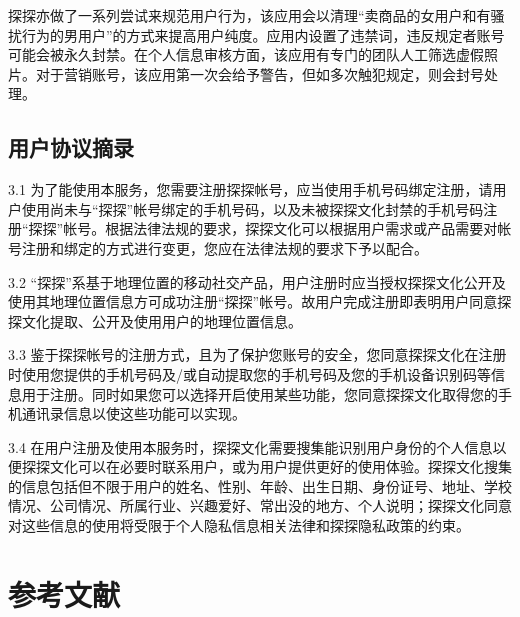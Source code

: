 \documentclass[UTF8]{ctexart}
\begin{document}
探探亦做了一系列尝试来规范用户行为，该应用会以清理“卖商品的女用户和有骚扰行为的男用户”的方式来提高用户纯度。应用内设置了违禁词，违反规定者账号可能会被永久封禁。在个人信息审核方面，该应用有专门的团队人工筛选虚假照片。对于营销账号，该应用第一次会给予警告，但如多次触犯规定，则会封号处理。

\subsection{}

\subsection{用户协议摘录}
\begin{tcolorbox}
    3.1 为了能使用本服务，您需要注册探探帐号，应当使用手机号码绑定注册，请用户使用尚未与“探探”帐号绑定的手机号码，以及未被探探文化封禁的手机号码注册“探探”帐号。根据法律法规的要求，探探文化可以根据用户需求或产品需要对帐号注册和绑定的方式进行变更，您应在法律法规的要求下予以配合。

    3.2 “探探”系基于地理位置的移动社交产品，用户注册时应当授权探探文化公开及使用其地理位置信息方可成功注册“探探”帐号。故用户完成注册即表明用户同意探探文化提取、公开及使用用户的地理位置信息。

    3.3 鉴于探探帐号的注册方式，且为了保护您账号的安全，您同意探探文化在注册时使用您提供的手机号码及/或自动提取您的手机号码及您的手机设备识别码等信息用于注册。同时如果您可以选择开启使用某些功能，您同意探探文化取得您的手机通讯录信息以使这些功能可以实现。

    3.4 在用户注册及使用本服务时，探探文化需要搜集能识别用户身份的个人信息以便探探文化可以在必要时联系用户，或为用户提供更好的使用体验。探探文化搜集的信息包括但不限于用户的姓名、性别、年龄、出生日期、身份证号、地址、学校情况、公司情况、所属行业、兴趣爱好、常出没的地方、个人说明；探探文化同意对这些信息的使用将受限于个人隐私信息相关法律和探探隐私政策的约束。\cite{MoMoAgreement}
\end{tcolorbox}


\section{参考文献}



\end{document}
